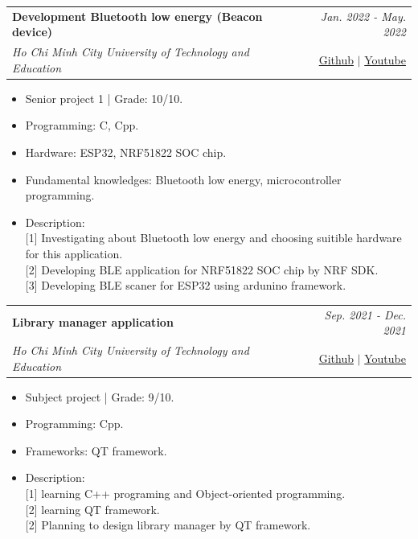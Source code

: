 \documentclass[a4paper,11pt]{article}
\makeatletter
\newcommand{\resumeProject}[4]{
\vspace{0.5mm}\item
    \begin{tabular*}{0.98\textwidth}[t]{l@{\extracolsep{\fill}}r}
        \textbf{#1} & \textit{\footnotesize{#3}} \\
        \footnotesize{\textit{#2}} & \footnotesize{#4}
    \end{tabular*}
    \vspace{-2.4mm}
}
\newcommand{\resumeItemListStart}{\begin{justify}\begin{itemize}[leftmargin=3ex, rightmargin=2ex, noitemsep,labelsep=1.2mm,itemsep=0mm]\small}
\newcommand{\resumeItemListEnd}{\end{itemize}\end{justify}\vspace{-2mm}}
\makeatother
\begin{document}
\resumeProject
      {Development Bluetooth low energy (Beacon device)} %
      {Ho Chi Minh City University of Technology and Education} %
      {Jan. 2022 - May. 2022}
      {\href{https://github.com/Winxkin/beaconapplication}{Github} $|$ \href{https://www.youtube.com/watch?v=Auvf9YhzOnM}{Youtube}}
      \resumeItemListStart
        \item {Senior project 1 | Grade: 10/10.}
        \item {Programming: C, Cpp.}
        \item {Hardware: ESP32, NRF51822 SOC chip.}
        \item {Fundamental knowledges: Bluetooth low energy, microcontroller programming.}
        \item {Description:}\hfill
        \\ {[1] Investigating about Bluetooth low energy and choosing suitible hardware for this application.}
        \\ {[2] Developing BLE application for NRF51822 SOC chip by NRF SDK.}
        \\ {[3] Developing BLE scaner for ESP32 using ardunino framework.}
\resumeItemListEnd

\resumeProject
      {Library manager application} %
      {Ho Chi Minh City University of Technology and Education} %
      {Sep. 2021 - Dec. 2021} %
      {\href{https://github.com/Winxkin/libManager}{Github} $|$ \href{https://www.youtube.com/watch?v=QobJnvS4IBI}{Youtube}} %
      \resumeItemListStart
        \item {Subject project | Grade: 9/10.}
        \item {Programming: Cpp.}
        \item {Frameworks: QT framework.}
        \item {Description:}\hfill
        \\ {[1] learning C++ programing and Object-oriented programming.}
        \\ {[2] learning QT framework.}
        \\ {[2] Planning to design library manager by QT framework.}
\resumeItemListEnd
    
\end{document}
